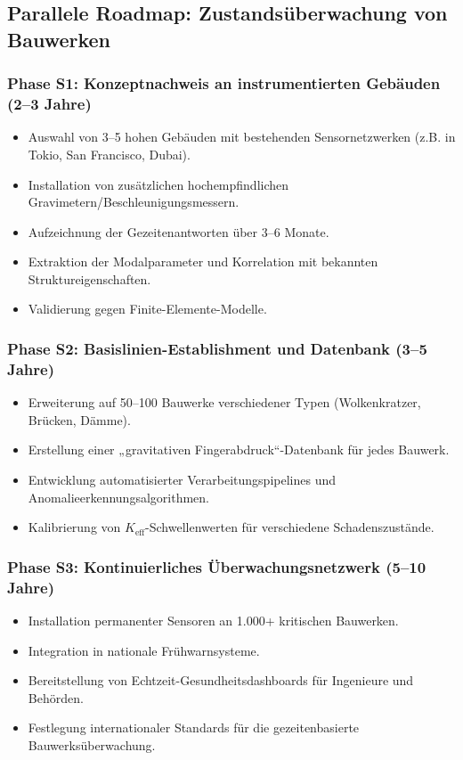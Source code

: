 \documentclass[12pt,a4paper]{article}
\theoremstyle{remark}
\begin{document}
	\subsection{Parallele Roadmap: Zustandsüberwachung von Bauwerken}
	
	\subsubsection{Phase S1: Konzeptnachweis an instrumentierten Gebäuden (2–3 Jahre)}
	
	\begin{itemize}
		\item Auswahl von 3–5 hohen Gebäuden mit bestehenden Sensornetzwerken (z.B. in Tokio, San Francisco, Dubai).
		\item Installation von zusätzlichen hochempfindlichen Gravimetern/Beschleunigungsmessern.
		\item Aufzeichnung der Gezeitenantworten über 3–6 Monate.
		\item Extraktion der Modalparameter und Korrelation mit bekannten Struktureigenschaften.
		\item Validierung gegen Finite-Elemente-Modelle.
	\end{itemize}
	
	\subsubsection{Phase S2: Basislinien-Establishment und Datenbank (3–5 Jahre)}
	
	\begin{itemize}
		\item Erweiterung auf 50–100 Bauwerke verschiedener Typen (Wolkenkratzer, Brücken, Dämme).
		\item Erstellung einer „gravitativen Fingerabdruck“-Datenbank für jedes Bauwerk.
		\item Entwicklung automatisierter Verarbeitungspipelines und Anomalieerkennungsalgorithmen.
		\item Kalibrierung von \(K_{\mathrm{eff}}\)-Schwellenwerten für verschiedene Schadenszustände.
	\end{itemize}
	
	\subsubsection{Phase S3: Kontinuierliches Überwachungsnetzwerk (5–10 Jahre)}
	
	\begin{itemize}
		\item Installation permanenter Sensoren an 1.000+ kritischen Bauwerken.
		\item Integration in nationale Frühwarnsysteme.
		\item Bereitstellung von Echtzeit-Gesundheitsdashboards für Ingenieure und Behörden.
		\item Festlegung internationaler Standards für die gezeitenbasierte Bauwerksüberwachung.
	\end{itemize}
	
\end{document}
